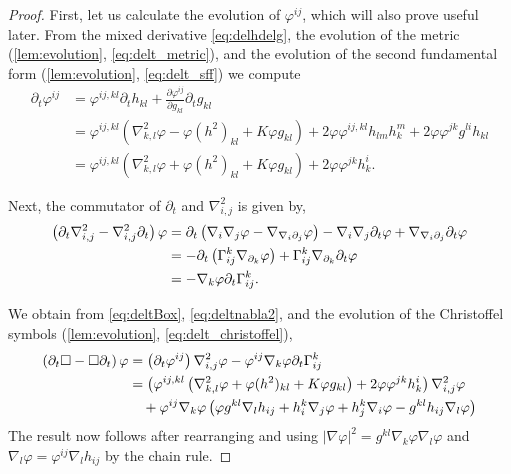 \documentclass{amsart}
\begin{document}
\begin{proof}
First, let us calculate the evolution of \(\varphi^{ij}\), which will also prove useful later. From the mixed derivative \cref{eq:delhdelg}, the evolution of the metric (\cref{lem:evolution}, \cref{eq:delt_metric}), and the evolution of the second fundamental form (\cref{lem:evolution}, \cref{eq:delt_sff}) we compute
\begin{equation}
\label{eq:deltBox}
\begin{split}
\partial_{t} \varphi^{ij} &= \varphi^{ij,kl} \partial_t h_{kl} + \frac{\partial\varphi^{ij}}{\partial g_{kl}} \partial_t g_{kl} \\
&= \varphi^{ij,kl} \left(\nabla^2_{k,l} \varphi - \varphi(h^2)_{kl} + K \varphi g_{kl}\right) + 2\varphi \varphi^{ij,kl} h_{lm}h^{m}_{k} + 2\varphi\varphi^{jk}g^{li}h_{kl} \\
&=\varphi^{ij,kl} \left(\nabla^2_{k,l} \varphi + \varphi(h^2)_{kl} + K \varphi g_{kl}\right) + 2\varphi\varphi^{jk}h^{i}_{k}.
\end{split}
\end{equation}

Next, the commutator of \(\partial_t\) and \(\nabla^2_{i,j}\) is given by,
\begin{equation}
\label{eq:deltnabla2}
\begin{split}
\left(\partial_{t}\nabla^2_{i,j} - \nabla^2_{i,j}\partial_{t}\right) \varphi &= \partial_t \left(\nabla_i \nabla_j \varphi - \nabla_{\nabla_i \partial_j} \varphi\right) - \nabla_i \nabla_j \partial_t \varphi + \nabla_{\nabla_i \partial_j} \partial_t \varphi \\
&= - \partial_t \left(\Gamma_{ij}^k \nabla_{\partial_k} \varphi\right) + \Gamma_{ij}^k \nabla_{\partial_k} \partial_t \varphi \\
&= - \nabla_k \varphi \partial_t \Gamma_{ij}^k.
\end{split}
\end{equation}

We obtain from \cref{eq:deltBox}, \cref{eq:deltnabla2}, and the evolution of the Christoffel symbols (\cref{lem:evolution}, \cref{eq:delt_christoffel}),
\[
\begin{split}
\left(\partial_{t}\Box - \Box\partial_{t}\right) \varphi &= \left(\partial_{t}\varphi^{ij}\right) \nabla^2_{i,j} \varphi - \varphi^{ij}\nabla_k \varphi\partial_t \Gamma^{k}_{ij} \\
&= \left(\varphi^{ij,kl} \left(\nabla^2_{k,l} \varphi + \varphi(h^2)_{kl} + K \varphi g_{kl}\right) + 2\varphi\varphi^{jk}h^{i}_{k}\right) \nabla^2_{i,j} \varphi \\
&\quad + \varphi^{ij} \nabla_k \varphi \left(\varphi g^{kl} \nabla_l h_{ij} + h^k_i \nabla_j \varphi + h^k_j \nabla_i \varphi - g^{kl} h_{ij} \nabla_l \varphi\right)
\end{split}
\]
The result now follows after rearranging and using \(|\nabla \varphi|^2 = g^{kl}\nabla_k \varphi \nabla_l \varphi\) and \(\nabla_l \varphi = \varphi^{ij} \nabla_l h_{ij}\) by the chain rule.
\end{proof}
\end{document}
